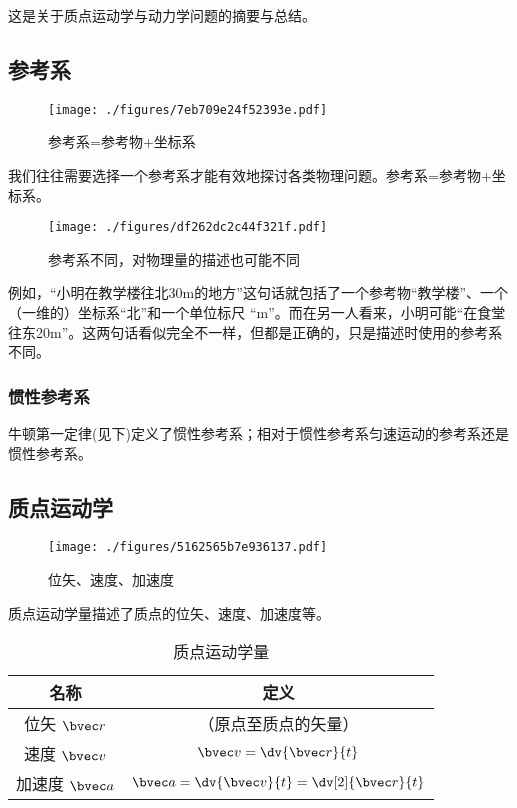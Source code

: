 
这是关于质点运动学与动力学问题的摘要与总结。

\subsection{参考系}
\begin{figure}[ht]
\centering
\texttt{[image: ./figures/7eb709e24f52393e.pdf]}
\caption{参考系=参考物+坐标系} \label{fig_MPAB_1}
\end{figure}
我们往往需要选择一个参考系才能有效地探讨各类物理问题。参考系=参考物+坐标系。

\begin{figure}[ht]
\centering
\texttt{[image: ./figures/df262dc2c44f321f.pdf]}
\caption{参考系不同，对物理量的描述也可能不同} \label{fig_MPAB_2}
\end{figure}
例如，“小明在教学楼往北30m的地方”这句话就包括了一个参考物“教学楼”、一个（一维的）坐标系“北”和一个单位标尺 “m”。而在另一人看来，小明可能“在食堂往东20m”。这两句话看似完全不一样，但都是正确的，只是描述时使用的参考系不同。

\subsubsection{惯性参考系}
牛顿第一定律(见下)定义了惯性参考系；相对于惯性参考系匀速运动的参考系还是惯性参考系。

\subsection{质点运动学}
\begin{figure}[ht]
\centering
\texttt{[image: ./figures/5162565b7e936137.pdf]}
\caption{位矢、速度、加速度} \label{fig_MPAB_3}
\end{figure}

质点运动学量描述了质点的位矢、速度、加速度等。
\begin{table}[ht]
\centering
\caption{质点运动学量}\label{tab_MPAB_1}
\begin{tabular}{|c|c|}
\hline
名称 & 定义 \\
\hline
位矢 $\bvec r$ & （原点至质点的矢量） \\
\hline
速度 $\bvec v$& $\bvec v = \dv{\bvec r}{t}$ \\
\hline
加速度 $\bvec a$& $\bvec a = \dv{\bvec v}{t} = \dv[2]{\bvec r}{t}$ \\
\hline
\end{tabular}
\end{table}

